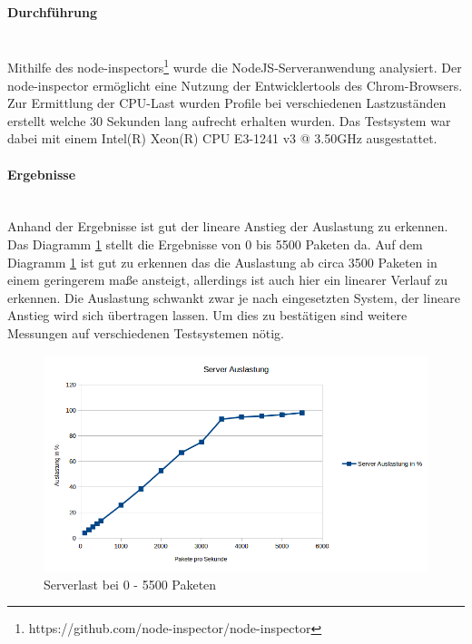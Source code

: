 \documentclass[a4paper]{spie}  %
\begin{document}
\paragraph{Durchführung}\mbox{}\\
Mithilfe des node-inspectors\footnote{https://github.com/node-inspector/node-inspector} wurde die NodeJS-Serveranwendung analysiert. Der node-inspector ermöglicht eine Nutzung der Entwicklertools des Chrom-Browsers. Zur Ermittlung der CPU-Last wurden Profile bei verschiedenen Lastzuständen erstellt welche 30 Sekunden lang aufrecht erhalten wurden. Das Testsystem war dabei mit einem Intel(R) Xeon(R) CPU E3-1241 v3 @ 3.50GHz ausgestattet.

\begin{minipage}[t]{0.4\textwidth}
	\vspace{0pt}
	\paragraph{Ergebnisse}\mbox{}\\
	Anhand der Ergebnisse ist gut der lineare Anstieg der Auslastung zu erkennen. Das Diagramm \ref{fig:ServerLast2} stellt die Ergebnisse von 0 bis 5500 Paketen da. Auf dem Diagramm \ref{fig:ServerLast2} ist gut zu erkennen das die Auslastung ab circa 3500 Paketen in einem geringerem maße ansteigt, allerdings ist auch hier ein linearer Verlauf zu erkennen. Die Auslastung schwankt zwar je nach eingesetzten System, der lineare Anstieg wird sich übertragen lassen. Um dies zu bestätigen sind weitere Messungen auf verschiedenen Testsystemen nötig.
\end{minipage}
\hfill
\begin{minipage}[t]{0.5\textwidth}
	\begin{figure}[H]	
	\vspace{0pt}
		\centering
		\includegraphics[width=1\textwidth]{./images/ServerLast3.png}
		\caption{Serverlast bei 0 - 5500 Paketen}
		\label{fig:ServerLast2}
	\end{figure}		
\end{minipage}
\end{document}
